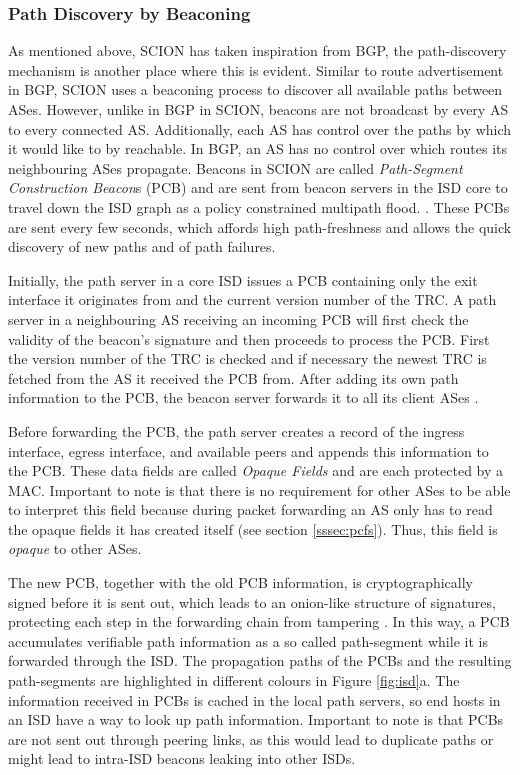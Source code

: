 \documentclass[../eva1_scion.tex]{subfiles}
\begin{document}
    \subsubsection{Path Discovery by Beaconing}\label{sssec:beaconing}
    As mentioned above, SCION has taken inspiration from BGP, the path-discovery mechanism is another place where this is evident. Similar to route advertisement in BGP, SCION uses a beaconing process to discover all available paths between ASes. However, unlike in BGP in SCION, beacons are not broadcast by every AS to every connected AS. Additionally, each AS has control over the paths by which it would like to by reachable. In BGP, an AS has no control over which routes its neighbouring ASes propagate. Beacons in SCION are called \textit{Path-Segment Construction Beacon}s (PCB) and are  sent from beacon servers in the ISD core to travel down the ISD graph as a policy constrained multipath flood. \cite{scion_2011}. These PCBs are sent every few seconds, which affords high path-freshness and allows the quick discovery of new paths and of path failures.

    Initially, the path server in a core ISD issues a PCB containing only the exit interface it originates from and the current version number of the TRC. A path server in a neighbouring AS receiving an incoming PCB will first check the validity of the beacon's signature and then proceeds to process the PCB. First the version number of the TRC is checked and if necessary the newest TRC is fetched  from the AS it received the PCB from. After adding its own path information to the PCB, the beacon server forwards it to all its client ASes \cite{scion_2011}.

    Before forwarding the PCB, the path server creates a record of the ingress interface, egress interface, and available peers and  appends this information to the PCB. These data fields are called \textit{Opaque Fields} and are each protected by a MAC. Important to note is that  there is no requirement for other ASes to be able to interpret this field because during packet forwarding an AS only has to read  the opaque fields it has created itself (see section \ref{sssec:pcfs}). Thus, this field is \textit{opaque} to other ASes.

    The new PCB, together with the old PCB information, is cryptographically signed before it is sent out, which leads to an onion-like structure of signatures, protecting each step in the forwarding chain from tampering \cite{scion_2011}. In this way, a PCB accumulates verifiable path information as a so called path-segment while it is forwarded through the ISD. The propagation paths of the PCBs and the resulting path-segments are highlighted in different colours in Figure \ref{fig:isd}a. The information received in PCBs is cached in the local path servers, so end hosts in an ISD have a way to look up path information. Important to note is that PCBs are not sent out through peering links, as this would lead to duplicate paths or might lead to intra-ISD beacons leaking into other ISDs.
\end{document}
